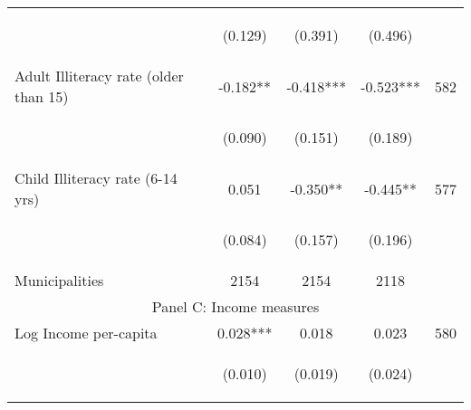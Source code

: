 \begin{tabular}{lcccc}
\vspace{4pt} &  \begin{footnotesize}(0.129)\end{footnotesize}   &
			    \begin{footnotesize}(0.391)\end{footnotesize}   &
			    \begin{footnotesize}(0.496)\end{footnotesize}   &
			     \\          

Adult Illiteracy rate (older than 15)  &  -0.182**    &    -0.418***   &     -0.523***  &  582  \\

\vspace{4pt} &  \begin{footnotesize}(0.090)\end{footnotesize}   &
			    \begin{footnotesize}(0.151)\end{footnotesize}   &
			    \begin{footnotesize}(0.189)\end{footnotesize}   &
			     \\          

Child Illiteracy rate (6-14 yrs)  &  0.051    &    -0.350**   &     -0.445**  &  577  \\

\vspace{4pt} &  \begin{footnotesize}(0.084)\end{footnotesize}   &
			    \begin{footnotesize}(0.157)\end{footnotesize}   &
			    \begin{footnotesize}(0.196)\end{footnotesize}   &
			     \\          


Municipalities  &   2154   &    2154     &  2118      	\\

\hline		

\multicolumn{5}{c}{Panel C: Income measures} \\

Log Income per-capita     &  0.028***    &    0.018   &     0.023  &  580   \\

\vspace{4pt} &  \begin{footnotesize}(0.010)\end{footnotesize}   &
			    \begin{footnotesize}(0.019)\end{footnotesize}   &
			    \begin{footnotesize}(0.024)\end{footnotesize}   &
			     \\          



\end{tabular}
